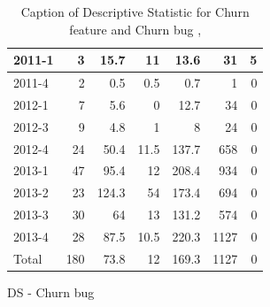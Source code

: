 \documentclass[UKenglish]{ifimaster}  %
\begin{document}
\begin{appendices}
\begin{table}[!htbp]
\begin{adjustwidth}{-1.5cm}{}
\begin{subfigure}[b]{0.3\textwidth}
{\begin{tabular}{ | l | r | r | r | r | r | r | }
 2011-1  & 3 & 15.7 & 11 & 13.6 & 31 & 5 \\ \hline
 2011-4  & 2 & 0.5 & 0.5 & 0.7 & 1 & 0\\ \hline
 2012-1  & 7 & 5.6 & 0 &12.7 & 34 & 0\\ \hline
 2012-3  & 9 & 4.8 & 1 & 8 & 24 & 0\\ \hline
 2012-4  & 24 & 50.4 & 11.5 & 137.7 & 658 & 0\\ \hline
 2013-1  & 47 & 95.4 & 12 & 208.4 & 934 & 0\\ \hline
 2013-2  & 23 & 124.3 & 54 & 173.4 & 694 & 0\\ \hline
 2013-3  & 30 & 64 & 13 & 131.2 & 574 & 0\\ \hline
 2013-4  & 28 & 87.5 & 10.5 & 220.3 & 1127 & 0\\ \hline
 Total  & 180 & 73.8 & 12 & 169.3 & 1127 & 0\\ \hline
\end{tabular}
}
\caption{DS - Churn bug}
 \label{DS:CB:6}
\end{subfigure}
\end{adjustwidth}
\caption[Optional caption for list of figures]{Caption of Descriptive Statistic for Churn feature and Churn bug , }
\label{DS:6:4}
\end{table}




\end{appendices}
\end{document}
